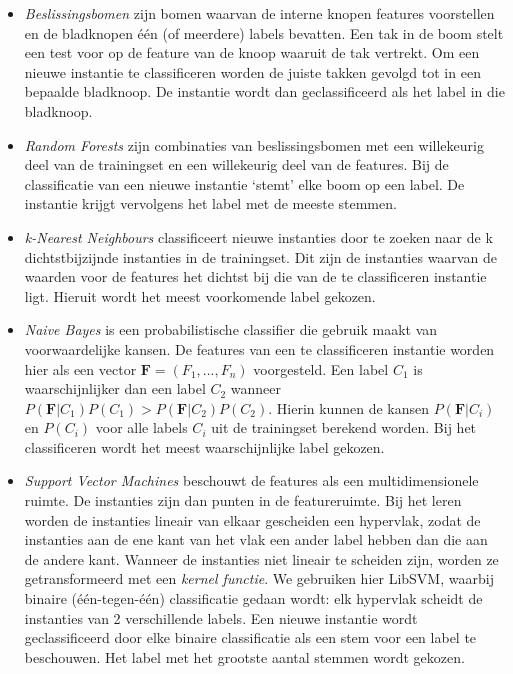\documentclass{article}
\begin{document}
\begin{itemize}
\item \textit{Beslissingsbomen} zijn bomen waarvan de interne knopen features voorstellen en de bladknopen \'e\'en (of meerdere) labels bevatten. Een tak in de boom stelt een test voor op de feature van de knoop waaruit de tak vertrekt. Om een nieuwe instantie te classificeren worden de juiste takken gevolgd tot in een bepaalde bladknoop. De instantie wordt dan geclassificeerd als het label in die bladknoop.
\item \textit{Random Forests} zijn combinaties van beslissingsbomen met een willekeurig deel van de trainingset en een willekeurig deel van de features. Bij de classificatie van een nieuwe instantie `stemt' elke boom op een label. De instantie krijgt vervolgens het label met de meeste stemmen.
\item \textit{k-Nearest Neighbours} classificeert nieuwe instanties door te zoeken naar de k dichtstbijzijnde instanties in de trainingset. Dit zijn de instanties waarvan de waarden voor de features het dichtst bij die van de te classificeren instantie ligt. Hieruit wordt het meest voorkomende label gekozen.
\item \textit{Naive Bayes} is een probabilistische classifier die gebruik maakt van voorwaardelijke kansen. De features van een te classificeren instantie worden hier als een vector $\mathbf{F} = (F_1, ..., F_n)$ voorgesteld. Een label $C_1$ is waarschijnlijker dan een label $C_2$ wanneer $P(\mathbf{F}|C_1) P(C_1) > P(\mathbf{F}|C_2) P(C_2)$. Hierin kunnen de kansen $P(\mathbf{F}|C_i)$ en $P(C_i)$ voor alle labels $C_i$ uit de trainingset berekend worden. Bij het classificeren wordt het meest waarschijnlijke label gekozen.
\item \textit{Support Vector Machines} beschouwt de features als een multidimensionele ruimte. De instanties zijn dan punten in de featureruimte. Bij het leren worden de instanties lineair van elkaar gescheiden een hypervlak, zodat de instanties aan de ene kant van het vlak een ander label hebben dan die aan de andere kant. Wanneer de instanties niet lineair te scheiden zijn, worden ze getransformeerd met een \textit{kernel functie}. We gebruiken hier LibSVM, %
waarbij binaire (\'e\'en-tegen-\'e\'en) classificatie gedaan wordt: elk hypervlak scheidt de instanties van 2 verschillende labels. Een nieuwe instantie wordt geclassificeerd door elke binaire classificatie als een stem voor een label te beschouwen. Het label met het grootste aantal stemmen wordt gekozen.
\end{itemize}
\end{document}
